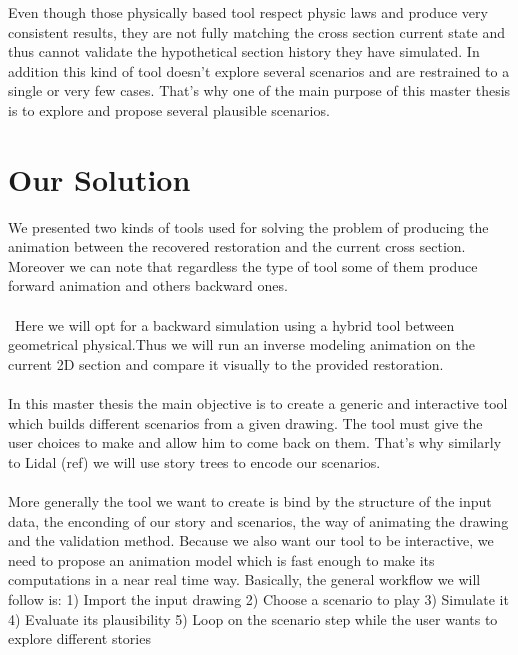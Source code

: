 \documentclass[12pt, a4paper]{memoir} %
\begin{document}
Even though those physically based tool respect physic laws and produce very consistent results, they are not fully matching the cross section current state and thus cannot validate the hypothetical section history they have simulated. In addition this kind of tool doesn't explore several scenarios and are restrained to a single or very few cases. 
That's why one of the main purpose of this master thesis is to explore and propose several plausible scenarios.

\section{Our Solution}

We presented two kinds of tools used for solving the problem of producing the animation between the recovered restoration and the current cross section. Moreover we can note that regardless the type of tool some of them produce forward animation and others backward ones. \\\\\
Here we will opt for a backward simulation using a hybrid tool between geometrical physical.Thus we will run an inverse modeling animation on the current 2D section and compare it visually to the provided restoration.\\\\

In this master thesis the main objective is to create a generic and interactive tool which builds different scenarios from a given drawing. The tool must give the user choices to make and allow him to come back on them. That's why similarly to Lidal (ref) we will use story trees to encode our scenarios.\\\\

More generally the tool we want to create is bind by the structure of the input data, the enconding of our story and scenarios, the way of animating the drawing and the validation method. Because we also want our tool to be interactive, we need to propose an animation model which is fast enough to make its computations in a near real time way. Basically, the general workflow we will follow is: 1) Import the input drawing 2) Choose a scenario to play 3) Simulate it 4) Evaluate its plausibility 5) Loop on the scenario step while the user wants to explore different stories\\\\
\end{document}
